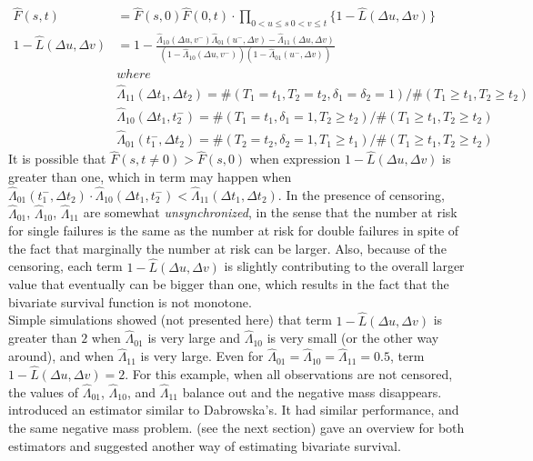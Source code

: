\documentclass[]{article}
\begin{document}
	$$
	\begin{aligned}
		\hat{F}(s,t) &= \hat{F}(s,0)\hat{F}(0,t)\cdot \prod_{{0<u\leq s~0<v\leq t}}\{1 - \hat{L}(\Delta u, \Delta v)\}\\
    1 - \hat{L}(\Delta u, \Delta v) &= 1 - \frac{\hat{\Lambda}_{10}(\Delta u,v^-)\hat{\Lambda}_{01}(u^-,\Delta v) - \hat{\Lambda}_{11}(\Delta u,\Delta v)}{\left(1-\hat{\Lambda}_{10}(\Delta u,v^-)\right)\left(1-\hat{\Lambda}_{01}(u^-,\Delta v)\right)}\\
  &where\\
	&\hat{\Lambda}_{11}(\Delta t_1, \Delta t_2) = \#(T_1=t_1, T_2=t_2, \delta_1=\delta_2=1)/\#(T_1\geq t_1, T_2\geq t_2)\\
	&\hat{\Lambda}_{10}(\Delta t_1, t_2^-) = \#(T_1=t_1, \delta_1=1, T_2\geq t_2)/\#(T_1\geq t_1, T_2\geq t_2)\\
	&\hat{\Lambda}_{01}(t_1^-,\Delta  t_2) = \#(T_2=t_2, \delta_2=1, T_1\geq t_1)/\#(T_1\geq t_1, T_2\geq t_2)		
	\end{aligned}
	$$
It is possible that $\hat{F}(s,t\neq 0) > \hat{F}(s,0)$ when expression $1 - \hat{L}(\Delta u, \Delta v)$ is greater than one, which in term may happen when  $\hat{\Lambda}_{01}(t_1^-,\Delta  t_2) \cdot \hat{\Lambda}_{10}(\Delta t_1, t_2^-)< \hat{\Lambda}_{11}(\Delta t_1, \Delta t_2)$. In the presence of censoring, $\hat{\Lambda}_{01}$, $\hat{\Lambda}_{10}$, $\hat{\Lambda}_{11}$ are somewhat \emph{unsynchronized}, in the sense that the number at risk for single failures is the same as the number at risk for double failures in spite of the fact that marginally the number at risk can be larger. Also, because of the censoring, each term $1 - \hat{L}(\Delta u, \Delta v)$ is slightly contributing to the overall larger value that eventually can be bigger than one, which results in the fact that the bivariate survival function is not monotone.\\
Simple simulations showed (not presented here) that term $1 - \hat{L}(\Delta u, \Delta v)$ is greater than $2$ when $\hat{\Lambda}_{01}$ is very large and $\hat{\Lambda}_{10}$ is very small (or the other way around), and when $\hat{\Lambda}_{11}$ is very large. Even for $\hat{\Lambda}_{01} = \hat{\Lambda}_{10} = \hat{\Lambda}_{11} = 0.5$, term $1 - \hat{L}(\Delta u, \Delta v) = 2$. For this  example, when all observations are not censored, the values of $\hat{\Lambda}_{01}$, $\hat{\Lambda}_{10}$, and $\hat{\Lambda}_{11}$ balance out and the negative mass disappears.
~\\

\cite{prentice1992covariance} introduced an estimator similar to Dabrowska's. It had similar performance, and the same negative mass problem. \cite{van1997nonparametric} (see the next section) gave an overview for both estimators and suggested another way of estimating bivariate survival.
\end{document}

